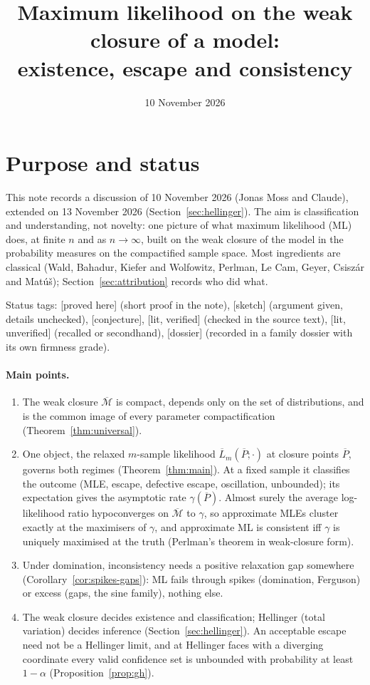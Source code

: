 \documentclass[11pt]{article}
\title{Maximum likelihood on the weak closure of a model:\\
existence, escape and consistency}
\author{}
\date{10 November 2026}
\newcommand{\bM}{\overline{\mathcal M}}
\newcommand{\bP}{\overline P}
\newcommand{\bL}{\overline L}
\newcommand{\status}[1]{\textsf{[#1]}}
\theoremstyle{definition}
\theoremstyle{remark}
\begin{document}
\maketitle

\section*{Purpose and status}
This note records a discussion of 10 November 2026 (Jonas Moss and Claude),
extended on 13 November 2026 (Section~\ref{sec:hellinger}).
The aim is classification and understanding, not novelty: one picture of
what maximum likelihood (ML) does, at finite $n$ and as $n\to\infty$, built
on the weak closure of the model in the probability measures on the
compactified sample space. Most ingredients are classical (Wald, Bahadur, Kiefer and
Wolfowitz, Perlman, Le Cam, Geyer, Csisz\'ar and Mat\'u\v s);
Section~\ref{sec:attribution} records who did what.

Status tags: \status{proved here} (short proof in the note), \status{sketch}
(argument given, details unchecked), \status{conjecture}, \status{lit,
verified} (checked in the source text), \status{lit, unverified} (recalled
or secondhand), \status{dossier} (recorded in a family dossier with its own
firmness grade).

\paragraph{Main points.}
\begin{enumerate}
\item The weak closure $\bM$ is compact, depends only on the set of
  distributions, and is the common image of every parameter
  compactification (Theorem~\ref{thm:universal}).
\item One object, the relaxed $m$-sample likelihood $\bL_m(\bP;\cdot)$ at
  closure points $\bP$, governs both regimes (Theorem~\ref{thm:main}). At a
  fixed sample it classifies the outcome (MLE, escape, defective escape,
  oscillation, unbounded); its expectation gives the asymptotic rate
  $\gamma(\bP)$. Almost surely the average log-likelihood ratio
  hypoconverges on $\bM$ to $\gamma$, so approximate MLEs cluster exactly
  at the maximisers of $\gamma$, and approximate ML is consistent iff
  $\gamma$ is uniquely maximised at the truth (Perlman's theorem in
  weak-closure form).
\item Under domination, inconsistency needs a positive relaxation gap
  somewhere (Corollary~\ref{cor:spikes-gaps}): ML fails through spikes
  (domination, Ferguson) or excess (gaps, the sine family), nothing else.
\item The weak closure decides existence and classification; Hellinger
  (total variation) decides inference (Section~\ref{sec:hellinger}). An
  acceptable escape need not be a Hellinger limit, and at Hellinger faces
  with a diverging coordinate every valid confidence set is unbounded with
  probability at least $1-\alpha$ (Proposition~\ref{prop:gh}).
\end{enumerate}
\end{document}
